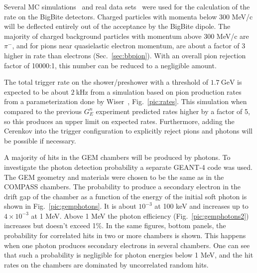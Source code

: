 Several MC simulations~\cite{pavel} and real data sets~\cite{riordan} were used for the calculation of the 
rate on the BigBite detectors. 
%
Charged particles with momenta below 300 MeV/c
will be deflected entirely out of the acceptance by the BigBite dipole. 
The majority of charged background particles with momentum above 300 MeV/c are $\pi^-$, and for pions near quasielastic 
electron momentum, are about a factor of 3 higher in rate than electrons (Sec.~\ref{sec:bbpion}).  
With an overall pion rejection factor of 10000:1, this number can be reduced to a negligible amount.

The total trigger rate on the shower/preshower with a threshold of $1.7~\mathrm{GeV}$ is expected to be about $2~\mathrm{kHz}$ from a simulation based on pion production rates from a parameterization done by Wiser~\cite{wiser}, Fig.~\ref{pic:rates}.  
This simulation when compared to the previous $G_E^n$ experiment predicted rates higher by a factor of 5, so this produces an upper limit on expected rates.  
Furthermore, adding the Cerenkov into the trigger configuration to explicitly reject pions and photons will be possible if necessary.

A majority of hits in the GEM chambers will be produced by photons.  
To investigate the photon detection probability a separate GEANT-4 code was used. 
The GEM geometry and materials were chosen to be the same as in the COMPASS chambers.
The probability to produce a secondary electron in the drift gap of the chamber as a function
of the energy of the initial soft photon is shown in Fig.~\ref{pic:gemphotons}. It is about $10^{-3}$ at 100 keV and
increases up to $4\times10^{-3}$ at 1 MeV. 
Above 1 MeV the photon efficiency (Fig.~\ref{pic:gemphotons2}) increases but doesn’t exceed 1\%. In the same figures, bottom panels, the probability for correlated
hits in two or more chambers is shown. 
This happens when one photon produces secondary electrons in several chambers. 
One can see that such a probability is negligible for photon energies below 1 MeV, and the hit rates on the chambers are dominated by uncorrelated
random hits.

